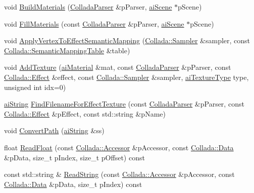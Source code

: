\begin{DoxyCompactItemize}
\item 
void \hyperlink{class_assimp_1_1_collada_loader_a14247078885f4a7b136a0eee34a583a7}{Build\+Materials} (\hyperlink{class_assimp_1_1_collada_parser}{Collada\+Parser} \&p\+Parser, \hyperlink{structai_scene}{ai\+Scene} $\ast$p\+Scene)
\item 
void \hyperlink{class_assimp_1_1_collada_loader_a8aac2afa34c6999cd7b329c9d3e9f701}{Fill\+Materials} (const \hyperlink{class_assimp_1_1_collada_parser}{Collada\+Parser} \&p\+Parser, \hyperlink{structai_scene}{ai\+Scene} $\ast$p\+Scene)
\item 
void \hyperlink{class_assimp_1_1_collada_loader_a2c2553495a40d6e76066fbbd2fe10d79}{Apply\+Vertex\+To\+Effect\+Semantic\+Mapping} (\hyperlink{struct_assimp_1_1_collada_1_1_sampler}{Collada\+::\+Sampler} \&sampler, const \hyperlink{struct_assimp_1_1_collada_1_1_semantic_mapping_table}{Collada\+::\+Semantic\+Mapping\+Table} \&table)
\item 
void \hyperlink{class_assimp_1_1_collada_loader_a9285fd1491811d836d17f7e11c9d921f}{Add\+Texture} (\hyperlink{classai_material}{ai\+Material} \&mat, const \hyperlink{class_assimp_1_1_collada_parser}{Collada\+Parser} \&p\+Parser, const \hyperlink{struct_assimp_1_1_collada_1_1_effect}{Collada\+::\+Effect} \&effect, const \hyperlink{struct_assimp_1_1_collada_1_1_sampler}{Collada\+::\+Sampler} \&sampler, \hyperlink{material_8h_a7dd415ff703a2cc53d1c22ddbbd7dde0}{ai\+Texture\+Type} type, unsigned int idx=0)
\item 
\hyperlink{structai_string}{ai\+String} \hyperlink{class_assimp_1_1_collada_loader_a0f17fc50e04f1e4038d6e6e2b67d074b}{Find\+Filename\+For\+Effect\+Texture} (const \hyperlink{class_assimp_1_1_collada_parser}{Collada\+Parser} \&p\+Parser, const \hyperlink{struct_assimp_1_1_collada_1_1_effect}{Collada\+::\+Effect} \&p\+Effect, const std\+::string \&p\+Name)
\item 
void \hyperlink{class_assimp_1_1_collada_loader_aef58b5b58ee7021bfc9965f23795550c}{Convert\+Path} (\hyperlink{structai_string}{ai\+String} \&ss)
\item 
float \hyperlink{class_assimp_1_1_collada_loader_ac24c5b7e7451fe981624e26994893f14}{Read\+Float} (const \hyperlink{struct_assimp_1_1_collada_1_1_accessor}{Collada\+::\+Accessor} \&p\+Accessor, const \hyperlink{struct_assimp_1_1_collada_1_1_data}{Collada\+::\+Data} \&p\+Data, size\+\_\+t p\+Index, size\+\_\+t p\+Offset) const 
\item 
const std\+::string \& \hyperlink{class_assimp_1_1_collada_loader_aec3c49353264a9c17d667b8911dd8d58}{Read\+String} (const \hyperlink{struct_assimp_1_1_collada_1_1_accessor}{Collada\+::\+Accessor} \&p\+Accessor, const \hyperlink{struct_assimp_1_1_collada_1_1_data}{Collada\+::\+Data} \&p\+Data, size\+\_\+t p\+Index) const 

\end{DoxyCompactItemize}
